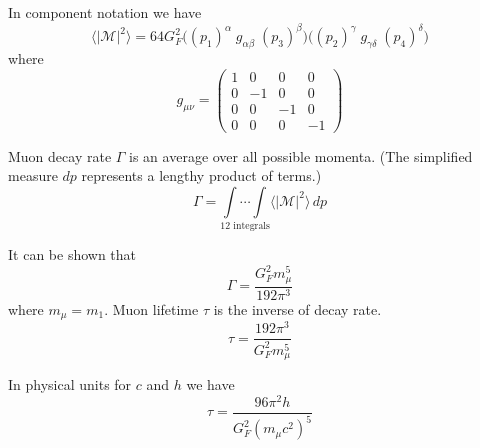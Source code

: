 \documentclass[12pt]{article}
\begin{document}
\noindent
In component notation we have
\begin{equation*}
\langle|\mathcal{M}|^2\rangle=64G_F^2
\bigg((p_1)^\alpha \; g_{\alpha\beta}\; (p_3)^\beta\bigg)
\bigg((p_2)^\gamma \; g_{\gamma\delta} \; (p_4)^\delta\bigg)
\end{equation*}
where
\begin{equation*}
g_{\mu\nu}=\begin{pmatrix}
1 & 0 & 0 & 0\\
0 & -1 & 0 & 0\\
0 & 0 & -1 & 0\\
0 & 0 & 0 & -1
\end{pmatrix}
\end{equation*}

\noindent
Muon decay rate $\Gamma$ is an average over all possible momenta.
(The simplified measure $dp$ represents a lengthy product of terms.)
\begin{equation*}
\Gamma=
\underset{\text{12 integrals}}
{\int\cdots\int}
\langle|\mathcal{M}|^2\rangle\,dp
\end{equation*}

\noindent
It can be shown that
\begin{equation*}
\Gamma=\frac{G_F^2 m_\mu^5}{192\pi^3}
\end{equation*}
where $m_\mu=m_1$.
Muon lifetime $\tau$ is the inverse of decay rate.
\begin{equation*}
\tau=\frac{192\pi^3}{G_F^2 m_\mu^5}
\end{equation*}

\noindent
In physical units for $c$ and $h$ we have
\begin{equation*}
\tau=\frac{96\pi^2h}{G_F^2\left(m_\mu c^2\right)^5}
\end{equation*}
\end{document}
